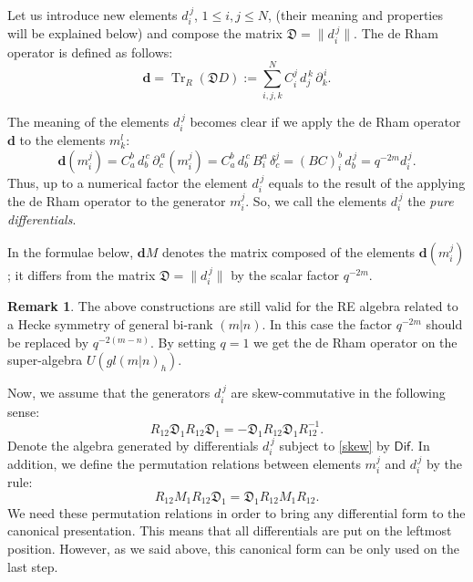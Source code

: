 \documentclass[11pt]{article}
\newcommand{\pa}{\partial}
\DeclareMathOperator{\Tr}{Tr}
\newcommand{\de}{\delta}
\newcommand{\DDDD}{\mathfrak{D}}
\newcommand{\dd}{\mathbf{d}}
\newcommand{\Dif}{\mathsf{Dif}}
\numberwithin{equation}{section}
\theoremstyle{plain}
\theoremstyle{definition}
\newtheorem{remark}[theorem]{Remark}
\begin{document}
Let us introduce new elements $d_i^{\,j}$, $1\leq i,j \leq N$, (their meaning and properties will be explained below) and compose
 the matrix $\DDDD=\|d_i^{\,j}\|$. The de Rham operator is defined as follows:
\begin{equation}
\dd=\Tr_R(\DDDD D):=\sum_{i,j,k}^N C_i^j \, d_j^{\,k}\, \pa_k^{\,i}.
\label{ddR}
\end{equation}

The meaning of the  elements $d_i^{\,j}$ becomes clear if we apply the de Rham operator $\dd$ to the elements $m_k^l$:
\begin{equation}
\dd(m_i^j)=C_a^b\, d_b^{\,c}\, \pa_c^{\,a}(m_i^j)= C_a^b\, d_b^{\,c}\, B_i^a \, \de _c^j= (BC)_i^b\, d_b^{\,j}=q^{-2m} d_i^{\,j}.
\label{diff}
\end{equation}
Thus, up to a numerical factor the element $d_i^{\,j}$ equals to the result of the applying the de Rham operator to the generator $m_i^j$.
So, we call the elements $d_i^{\,j}$ the {\em pure differentials}.

In the formulae below, $\dd M$ denotes the matrix composed of the elements $\dd(m_i^j)$; it differs from the matrix
$\DDDD=\|d_i^{\,j}\|$ by the scalar factor $q^{-2m}$.

\begin{remark}
The above constructions are still valid for the RE algebra related to a Hecke symmetry of general bi-rank $(m|n)$. In this case the
factor $q^{-2m}$ should be replaced by $q^{-2(m-n)}$. By setting $q=1$ we get the de Rham operator on the super-algebra
$U(gl(m|n)_h)$.
\end{remark}

Now, we assume that the generators $d_i^{\,j}$ are skew-commutative in the following sense:
\begin{equation}
R_{12}\DDDD_1R_{12} \DDDD_{1}=-\DDDD_1R_{12} \DDDD_{1} R_{12}^{-1}.
\label{skew}
\end{equation}
Denote the algebra generated by differentials $d_i^{\,j}$ subject to \eqref{skew} by $\Dif$.
In addition, we define the permutation relations between elements $m_i^j$ and $d_i^{\,j}$ by the rule:
\begin{equation}
R_{12}M_1R_{12} \DDDD_{1} = \DDDD_1 R_{12} M_{1} R_{12}.
\label{perm1}
\end{equation}
We need these permutation relations in order to bring any differential form to the canonical presentation. This means that all differentials
are put on the leftmost position. However, as we said above, this canonical form can be only used on the last step. 
\end{document}
